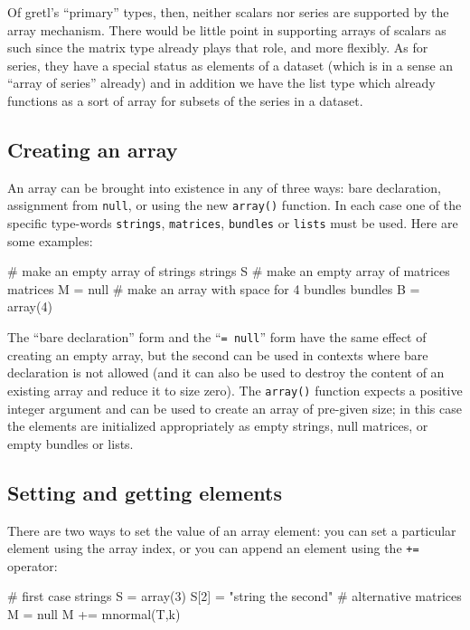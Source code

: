 Of gretl's ``primary'' types, then, neither scalars nor series are
supported by the array mechanism. There would be little point in
supporting arrays of scalars as such since the matrix type already
plays that role, and more flexibly. As for series, they have a special
status as elements of a dataset (which is in a sense an ``array of
series'' already) and in addition we have the list type which already
functions as a sort of array for subsets of the series in a dataset.

\subsection{Creating an array}

An array can be brought into existence in any of three ways: bare
declaration, assignment from \texttt{null}, or using the new
\texttt{array()} function. In each case one of the specific type-words
\texttt{strings}, \texttt{matrices}, \texttt{bundles} or
\texttt{lists} must be used. Here are some examples:

\begin{code}
# make an empty array of strings
strings S
# make an empty array of matrices
matrices M = null
# make an array with space for 4 bundles
bundles B = array(4)
\end{code}

The ``bare declaration'' form and the ``\texttt{= null}'' form have
the same effect of creating an empty array, but the second can be used
in contexts where bare declaration is not allowed (and it can also be
used to destroy the content of an existing array and reduce it to size
zero). The \texttt{array()} function expects a positive integer
argument and can be used to create an array of pre-given size; in this
case the elements are initialized appropriately as empty strings, null
matrices, or empty bundles or lists.

\subsection{Setting and getting elements}

There are two ways to set the value of an array element: you can set a
particular element using the array index, or you can append an element
using the \texttt{+=} operator:
\begin{code}
# first case
strings S = array(3)
S[2] = "string the second"
# alternative
matrices M = null
M += mnormal(T,k)
\end{code}

